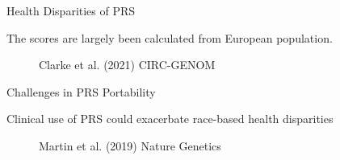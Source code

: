 \documentclass{beamer}
\begin{document}
\begin{frame}{Health Disparities of PRS}

The scores are largely been calculated from European population.
    \begin{figure}[h]	\noindent{}
     {\tiny Clarke et al. (2021) CIRC-GENOM}
    \label{fig:models}
\end{figure}



\end{frame}

\begin{frame}{Challenges in PRS Portability}

Clinical use of PRS could exacerbate race-based health disparities
\begin{figure}[h]	\noindent{}
         {\tiny Martin et al. (2019) Nature Genetics}
\label{fig:models}
\end{figure}
\end{frame}
\end{document}
